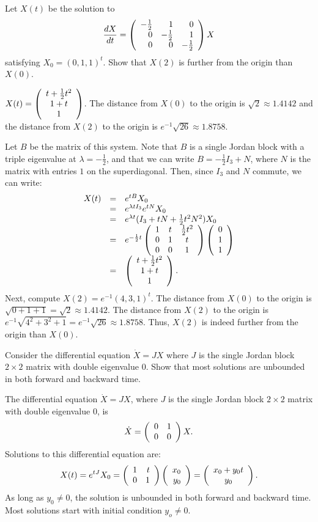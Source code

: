 \documentclass{ximera}
\begin{document}
\begin{exercise} \label{c11.1.3}
Let $X(t)$ be the solution to 
\[
\frac{dX}{dt} = \left(\begin{array}{rrr} 
-\mbox{$\frac{1}{2}$} & 1 & 0 \\ 0 & -\mbox{$\frac{1}{2}$} & 1\\ 0 & 0 & -\mbox{$\frac{1}{2}$}
\end{array}\right)X
\]
satisfying $X_0=(0,1,1)^t$. Show that $X(2)$ is further from the 
origin than $X(0)$.

\begin{solution}
\ans $X(t) = \left(\begin{array}{c} t + \frac{1}{2}t^2 \\ 1 + t \\ 1\end{array}\right)$. The distance from $X(0)$ to the 
origin is $\sqrt{2} \approx 1.4142$ and the distance from $X(2)$ to the origin is
$e^{-1}\sqrt{26} \approx 1.8758$.

\soln Let $B$ be the matrix of this system.  Note that $B$ is a single Jordan block
with a triple eigenvalue at $\lambda = -\frac{1}{2}$, and that we can write
$B = -\frac{1}{2}I_3 + N$, where $N$ is the matrix with entries $1$ on the
superdiagonal.  Then, since $I_3$ and $N$ commute, we can write:
\[
\begin{array}{rcl}
X(t) & = & e^{tB}X_0 \\
& = & e^{\lambda tI_3}e^{tN}X_0 \\
& = & e^{\lambda t}(I_3 + tN + \frac{1}{2}t^2N^2)X_0 \\
& = & e^{-\frac{1}{2} t}\left(\begin{array}{ccc} 1 & t & \frac{1}{2}t^2 \\ 0 & 1 & t \\ 0 & 0 & 1\end{array}\right)
\left(\begin{array}{r} 0 \\ 1 \\ 1\end{array}\right) \\
& = & \left(\begin{array}{c} t + \frac{1}{2}t^2 \\ 1 + t \\ 1\end{array}\right).
\end{array}
\]
Next, compute $X(2) = e^{-1}(4,3,1)^t$.
The distance from $X(0)$ to the origin is $\sqrt{0 + 1 + 1} = \sqrt{2}
\approx 1.4142$.  The distance from $X(2)$ to the origin is
$e^{-1}\sqrt{4^2 + 3^2 + 1} = e^{-1}\sqrt{26} \approx 1.8758$.
Thus, $X(2)$ is indeed further from the origin than $X(0)$.

\end{solution}
\end{exercise}

\begin{exercise} \label{c11.1.3A}
Consider the differential equation $\dot{X}=JX$ where $J$ is the single Jordan 
block $2\times 2$ matrix with double eigenvalue $0$.  Show that most 
solutions are unbounded in both forward and backward time.

\begin{solution}
The differential equation $\dot{X}=JX$, where $J$ is the 
single Jordan block $2\times 2$ matrix with double eigenvalue $0$, is
\[
\dot{X} = \left(\begin{array}{rr} 0 & 1\\ 0 &0\end{array}\right)X.
\]
Solutions to this differential equation are:
\[
X(t) = e^{tJ}X_0 = \left(\begin{array}{rr} 1 & t\\ 0 &1\end{array}\right)\left(\begin{array}{r} x_0 \\ y_0\end{array}\right) =
\left(\begin{array}{c} x_0+y_0t \\ y_0\end{array}\right).
\]
As long as $y_0\neq 0$, the solution is unbounded in both forward and 
backward time.  Most solutions start with initial condition $y_o\neq 0$.

\end{solution}
\end{exercise}
\end{document}

